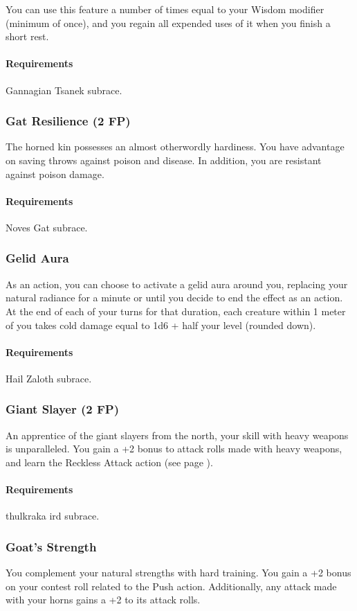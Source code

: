     You can use this feature a number of times equal to your Wisdom modifier (minimum of once), and you regain all expended uses of it when you finish a short rest.
    \paragraph{Requirements} Gannagian Tsanek subrace.
\subsubsection{Gat Resilience (2 FP)} \label{feat::gatresilience}
    The horned kin possesses an almost otherwordly hardiness.
    You have advantage on saving throws against poison and disease.
    In addition, you are resistant against poison damage.
    \paragraph{Requirements} Noves Gat subrace.
\subsubsection{Gelid Aura} \label{feat::gelidaura}
    As an action, you can choose to activate a gelid aura around you, replacing your natural radiance for a minute or until you decide to end the effect as an action.
    At the end of each of your turns for that duration, each creature within 1 meter of you takes cold damage equal to 1d6 + half your level (rounded down).
    \paragraph{Requirements} Hail Zaloth subrace.
\subsubsection{Giant Slayer (2 FP)} \label{feat::giantslayer}
    An apprentice of the giant slayers from the north, your skill with heavy weapons is unparalleled.
    You gain a +2 bonus to attack rolls made with heavy weapons, and learn the Reckless Attack action (see page \pageref{act::recklessattack}).
    \paragraph{Requirements} thulkraka ird subrace.
\subsubsection{Goat's Strength} \label{feat::goatsstrength}
    You complement your natural strengths with hard training.
    You gain a +2 bonus on your contest roll related to the Push action.
    Additionally, any attack made with your horns gains a +2 to its attack rolls.

